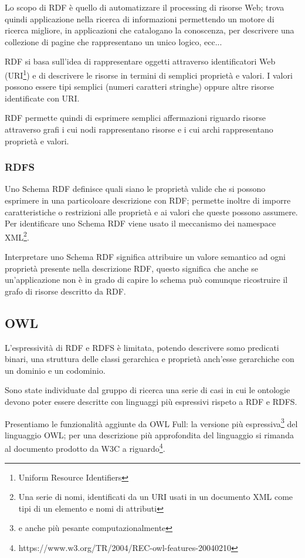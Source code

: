 Lo scopo di RDF è quello di automatizzare il processing di risorse Web; trova quindi applicazione nella ricerca di informazioni permettendo un motore di ricerca migliore, in applicazioni che catalogano la conoscenza, per descrivere una collezione di pagine che rappresentano un unico  logico, ecc...\cite{brickley1998resource}

RDF si basa sull'idea di rappresentare oggetti attraverso identificatori Web (URI\footnote{Uniform Resource Identifiers}) e di descrivere le risorse in termini di semplici proprietà e valori. I valori possono essere tipi semplici (numeri caratteri stringhe) oppure altre risorse identificate con URI.

RDF permette quindi di esprimere semplici affermazioni riguardo risorse attraverso grafi i cui nodi rappresentano risorse e i cui archi rappresentano proprietà e valori\cite{manola2004rdf}.
\subsubsection{RDFS}
Uno Schema RDF definisce quali siano le proprietà valide che si possono esprimere in una particoloare descrizione con RDF; permette inoltre di imporre caratteristiche o restrizioni alle proprietà e ai valori che queste possono assumere. Per identificare uno Schema RDF viene usato il meccanismo dei namespace XML\footnote{Una serie di nomi, identificati da un URI usati in un documento XML come tipi di un elemento e nomi di attributi\cite{bray1999namespaces}}.

Interpretare uno Schema RDF significa attribuire un valore semantico ad ogni proprietà presente nella descrizione RDF, questo significa che anche se un'applicazione non è in grado di capire lo schema può comunque ricostruire il grafo di risorse descritto da RDF\cite{miller1998introduction}.
\subsection{OWL}
L'espressività di RDF e RDFS è limitata, potendo descrivere somo predicati binari, una struttura delle classi gerarchica e proprietà anch'esse gerarchiche con un dominio e un codominio.

Sono state individuate dal gruppo di ricerca  una serie di casi in cui le ontologie devono poter essere descritte con linguaggi più espressivi rispeto a RDF e RDFS\cite{antoniou2009web}.

Presentiamo le funzionalità aggiunte da OWL Full: la versione più espressiva\footnote{e anche più pesante computazionalmente} del linguaggio OWL; per una descrizione più approfondita del linguaggio si rimanda al documento prodotto da W3C a riguardo\footnote{https://www.w3.org/TR/2004/REC-owl-features-20040210}.
